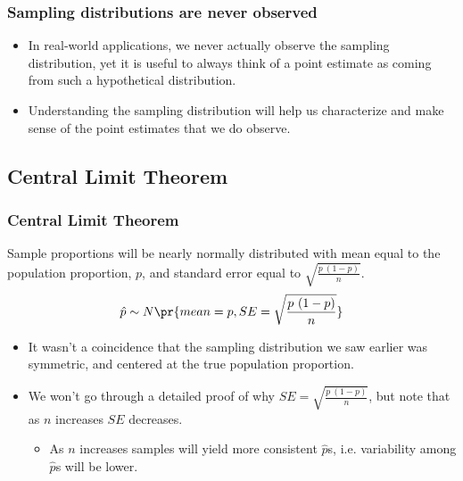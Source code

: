 
\begin{frame}
\frametitle{Sampling distributions are never observed}

\begin{itemize}

\item In real-world applications, we never actually observe the sampling distribution, yet it is useful to always think of a point estimate as coming from such a hypothetical distribution.

\item Understanding the sampling distribution will help us characterize and make sense of the point estimates that we do observe.

\end{itemize}

\end{frame}


\subsection{Central Limit Theorem}


\begin{frame}
\frametitle{Central Limit Theorem}

{Sample proportions will be nearly normally distributed with mean equal to the population proportion, $p$, and standard error equal to $\sqrt{\frac{p~(1-p)}{n}}$.
\[ \hat{p} \sim N \pr{ mean = p, SE = \sqrt{\frac{p~(1-p)}{n}} } \]
}

\begin{itemize}

\item It wasn't a coincidence that the sampling distribution we saw earlier was symmetric, and centered at the true population proportion.

\item We won't go through a detailed proof of why $SE =  \sqrt{\frac{p~(1-p)}{n}}$, but note that as $n$ increases $SE$ decreases.
\begin{itemize}
\item As $n$ increases samples will yield more consistent $\hat{p}$s, i.e. variability among $\hat{p}$s will be lower.
\end{itemize}

\end{itemize}

\end{frame}

